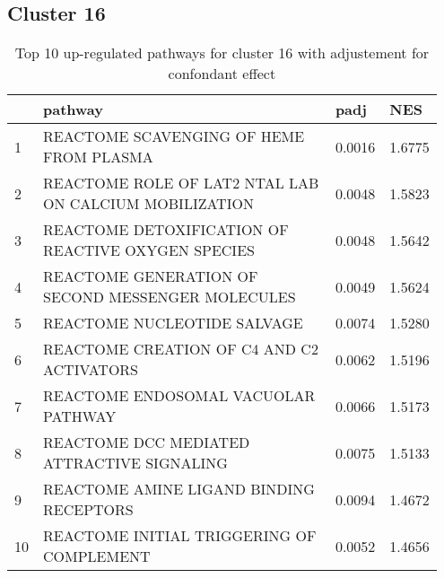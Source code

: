 \documentclass{article}
\begin{document}
\subsection{Cluster 16 }
\begin{table}[H]
\centering
\begin{tabular}{p{0.05\linewidth}p{0.7\linewidth}p{0.1\linewidth}p{0.1\linewidth}}
  \hline
 & pathway & padj & NES \\ 
  \hline
1 & REACTOME SCAVENGING OF HEME FROM PLASMA & 0.0016 & 1.6775 \\ 
  2 & REACTOME ROLE OF LAT2 NTAL LAB ON CALCIUM MOBILIZATION & 0.0048 & 1.5823 \\ 
  3 & REACTOME DETOXIFICATION OF REACTIVE OXYGEN SPECIES & 0.0048 & 1.5642 \\ 
  4 & REACTOME GENERATION OF SECOND MESSENGER MOLECULES & 0.0049 & 1.5624 \\ 
  5 & REACTOME NUCLEOTIDE SALVAGE & 0.0074 & 1.5280 \\ 
  6 & REACTOME CREATION OF C4 AND C2 ACTIVATORS & 0.0062 & 1.5196 \\ 
  7 & REACTOME ENDOSOMAL VACUOLAR PATHWAY & 0.0066 & 1.5173 \\ 
  8 & REACTOME DCC MEDIATED ATTRACTIVE SIGNALING & 0.0075 & 1.5133 \\ 
  9 & REACTOME AMINE LIGAND BINDING RECEPTORS & 0.0094 & 1.4672 \\ 
  10 & REACTOME INITIAL TRIGGERING OF COMPLEMENT & 0.0052 & 1.4656 \\ 
   \hline
\end{tabular}
\caption{Top 10 up-regulated pathways for cluster 16 with adjustement for confondant effect} 
\label{tab:q3_2_conf_16}
\end{table}
\end{document}
